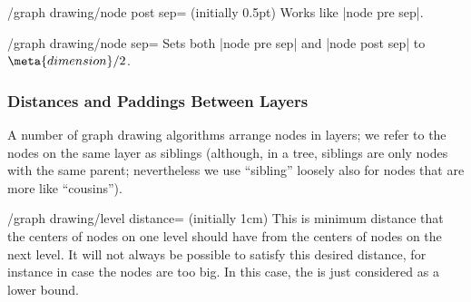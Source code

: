 \begin{key}{/graph drawing/node post sep= (initially 0.5pt)}
  Works like |node pre sep|.
\end{key}

\begin{key}{/graph drawing/node sep=}
  Sets both |node pre sep| and |node post sep| to
  $\meta{dimension}/2$.
\end{key}


\subsubsection{Distances and Paddings Between Layers}

A number of graph drawing algorithms arrange nodes in layers; we refer
to the nodes on the same layer as siblings (although, in a tree,
siblings are only nodes with the same parent; nevertheless we use
``sibling'' loosely also for nodes that are more like ``cousins'').

\begin{key}{/graph drawing/level distance= (initially 1cm)}
  This is minimum distance that the centers of nodes on one
  level should have from the centers of nodes on the next level. It
  will not always be possible to satisfy this desired distance, for
  instance in case the nodes are too big. In this case, the
   is just considered as a lower bound.
\begin{codeexample}[]
\end{codeexample}
\end{key}

